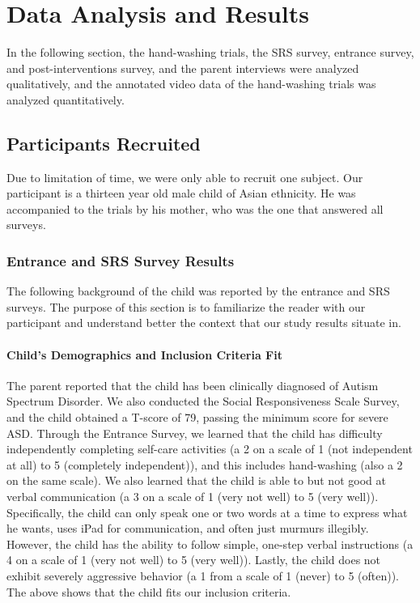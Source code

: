 \section{Data Analysis and Results}
\label{Sec:DataAnalysisAndResults}
In the following section, the hand-washing trials, the SRS survey, entrance survey, and post-interventions survey, and the parent interviews were analyzed qualitatively, and the annotated video data of the hand-washing trials was analyzed quantitatively.

\subsection{Participants Recruited}
Due to limitation of time, we were only able to recruit one subject.  Our participant is a thirteen year old male child of Asian ethnicity.  He was accompanied to the trials by his mother, who was the one that answered all surveys.

\subsubsection{Entrance and SRS Survey Results}
The following background of the child was reported by the entrance and SRS surveys.  The purpose of this section is to familiarize the reader with our participant and understand better the context that our study results situate in.

\paragraph{Child's Demographics and Inclusion Criteria Fit}
The parent reported that the child has been clinically diagnosed of Autism Spectrum Disorder.  We also conducted the Social Responsiveness Scale Survey, and the child obtained a T-score of 79, passing the minimum score for severe ASD.  Through the Entrance Survey, we learned that the child has difficulty independently completing self-care activities (a 2 on a scale of 1 (not independent at all) to 5 (completely independent)), and this includes hand-washing (also a 2 on the same scale).  We also learned that the child is able to but not good at verbal communication (a 3 on a scale of 1 (very not well) to 5 (very well)).  Specifically, the child can only speak one or two words at a time to express what he wants, uses iPad for communication, and often just murmurs illegibly.  However, the child has the ability to follow simple, one-step verbal instructions (a 4 on a scale of 1 (very not well) to 5 (very well)).  Lastly, the child does not exhibit severely aggressive behavior (a 1 from a scale of 1 (never) to 5 (often)).  The above shows that the child fits our inclusion criteria.

